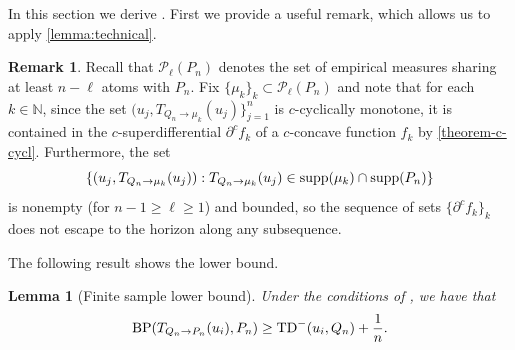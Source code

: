 \documentclass[11pt]{article}
\newcommand{\NN}{\mathbb{N}}
\theoremstyle{plain}
\newtheorem{lemma}[theorem]{Lemma}
\theoremstyle{definition}\newtheorem{definition}[theorem]{Definition}
\newtheorem{remark}[theorem]{Remark}
\theoremstyle{remark}
\begin{document}
In this section we derive . First we provide a useful remark, which allows us to apply \cref{lemma:technical}.  
%
\begin{remark}
\label{remark:discrete-extension}
Recall that $\mathcal{P}_\ell(P_n)$ denotes the set of empirical measures sharing at least $ n-\ell$ atoms with $P_n$. Fix $\{\mu_{k}\}_k\subset \mathcal{P}_\ell(P_n)$ and note that for each $k\in \NN$, since the set 
 $(u_j , { T}_{Q_n\to \mu_{k}}(u_j)\}_{j=1}^n $ is $c$-cyclically monotone, it is contained in the $c$-superdifferential $\partial^c f_{k}$ of a $c$-concave function $ f_{k}$ by \cref{theorem-c-cycl}. Furthermore, the set
$$\{(u_j,{ T}_{Q_n\to \mu_k}(u_j)) :   { T}_{Q_n\to \mu_k}(u_j) \in {\rm supp}(\mu_k) \cap {\rm supp}(P_n) \}$$
is nonempty (for $n-1\geq \ell\geq 1$) and bounded, so the sequence of sets $\{\partial^c f_{k}\}_k$ does not escape to the horizon along any subsequence. 

%
\end{remark}
The following result shows the lower bound. 
\begin{lemma}[Finite sample lower bound] \label{lem:finite_sample_lower}Under the conditions of , we have  that  
$$ {\rm BP}({ T}_{Q_n\to P_n}(u_i), P_n) \geq   
{\rm TD}^-(u_i, Q_n)+\frac{1}{n}. $$
\end{lemma}
\end{document}

